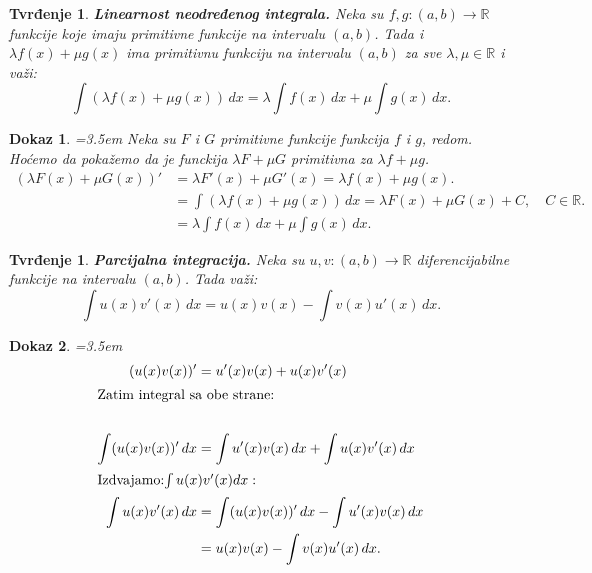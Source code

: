 \documentclass[11pt]{article}
\newcounter{mathitem}
\theoremstyle{plain}
\newtheorem{tvrdjenje}[mathitem]{Tvrđenje}
\theoremstyle{serbnodot}
\newtheorem*{dokaz}{Dokaz}
\begin{document}
\begin{tvrdjenje}{\textbf{Linearnost neodređenog integrala.}}
  Neka su $ f,g:(a,b) \to \mathbb{R} $ funkcije koje imaju primitivne funkcije na intervalu $ (a,b) $. Tada i $ \lambda f(x) + \mu g(x) $ ima primitivnu funkciju na intervalu $ (a,b) $ za sve $ \lambda, \mu \in \mathbb{R} $ i važi:
  \[
    \int (\lambda f(x) + \mu g(x)) \, dx = \lambda \int f(x) \, dx + \mu \int g(x) \, dx.
  \]
\end{tvrdjenje}
\begin{dokaz}
    
    \par\hangindent=3.5em
    Neka su $ F $ i $ G $ primitivne funkcije funkcija $ f $ i $ g $, redom. Hoćemo da pokažemo da je funckija $ \lambda F + \mu G $ primitivna za $ \lambda f + \mu g $. 
    \begin{align*}
      (\lambda F(x) + \mu G(x))' &= \lambda F'(x) + \mu G'(x) = \lambda f(x) + \mu g(x). \\
      & = \int (\lambda f(x) + \mu g(x)) \, dx = \lambda F(x) + \mu G(x) + C, \quad C \in \mathbb{R}.\\
      & = \lambda \int f(x) \, dx + \mu \int g(x) \, dx.
    \end{align*}
\end{dokaz}


\begin{tvrdjenje} {\textbf{Parcijalna integracija.}} Neka su $u, v:(a,b) \to \mathbb{R} $ diferencijabilne funkcije na intervalu $ (a,b) $. Tada važi:
\[
  \int u(x)v'(x) \, dx = u(x)v(x) - \int v(x)u'(x) \, dx.
\]
\end{tvrdjenje}
\begin{dokaz}
    \par\hangindent=3.5em
    \begin{align*}
      (u(x)v(x))' &= u'(x)v(x) + u(x)v'(x) \\
      \intertext{Zatim integral sa obe strane:} \\
      \int (u(x)v(x))' \, dx &= \int u'(x)v(x) \, dx + \int u(x)v'(x) \, dx \\
      \intertext{Izdvajamo:$ \int u(x)v'(x)dx:$} 
      \int u(x)v'(x) \, dx &= \int (u(x)v(x))' \, dx - \int u'(x)v(x) \, dx \\
      &= u(x)v(x) - \int v(x)u'(x) \, dx.
    \end{align*}
\end{dokaz}
\end{document}
